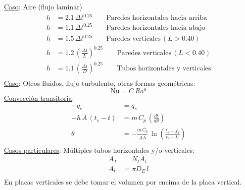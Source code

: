 \documentclass[letter,oneside,10pt]{article}
\begin{document}
\begin{multicols}{3}
\underline{Caso}: Aire (flujo laminar)
\begin{equation*}
    \begin{split}
        h &= 2.1\,\Delta t^{0.25}\qquad\text{Paredes horizontales hacia arriba}\\
        h &= 1.1\,\Delta t^{0.25}\qquad\text{Paredes horizontales hacia abajo}\\
        h &= 1.5\,\Delta t^{0.25}\qquad\text{Paredes verticales}\,(L > 0.40)\\
        h &= 1.2\,\left(\frac{\Delta t}{L}\right)^{0.25}\qquad\text{Paredes verticales}\,(L < 0.40)\\
        h &= 1.1\,\left(\frac{\Delta t}{D}\right)^{0.25}\qquad\text{Tubos horizontales y verticales}\\
    \end{split}
\end{equation*}
\underline{Caso}: Otros fluidos, flujo turbulento, otras formas geométricas:
\begin{equation*}
    \text{Nu} = C\,Ra^a
\end{equation*}
\underline{Convección transitoria}:
\begin{equation*}
    \begin{split}
        -q_c &= q_s\\
        -h\,A\,(t_s-t) &= m\,C_p\,\left(\frac{dt}{d\theta}\right)\\
        \theta &= -\frac{m\,\bar{C_p}}{A\,\bar{h}}\,\ln\left(\frac{t_s-f_f}{t_s-t_i}\right)\\
    \end{split}
\end{equation*}
\underline{Casos particulares}:
Múltiples tubos horizontales y/o verticales:
\begin{equation*}
    \begin{split}
        A_T &= N_t A_t\\
        A_t &= \pi D_E\,l\\
\end{split}
\end{equation*}
En placas verticales se debe tomar el volumen por encima de la placa vertical.
\\


\end{multicols}
\end{document}
